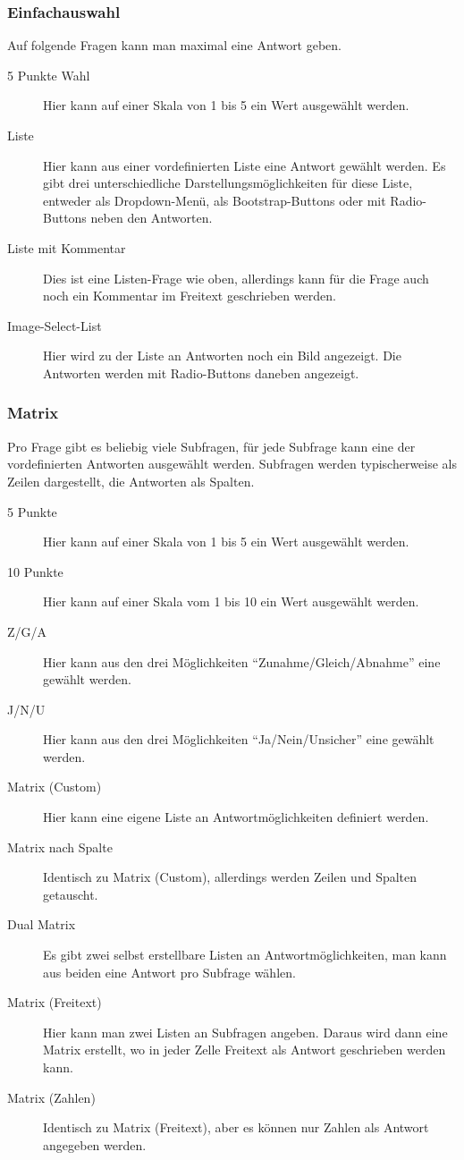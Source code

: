 \subsubsection{Einfachauswahl}

Auf folgende Fragen kann man maximal eine Antwort geben.
\begin{description}
	\item[5 Punkte Wahl] Hier kann auf einer Skala von 1 bis 5 ein Wert ausgewählt werden.
	\item[Liste] Hier kann aus einer vordefinierten Liste eine Antwort gewählt werden. Es gibt drei unterschiedliche Darstellungsmöglichkeiten für diese Liste, entweder als Dropdown-Menü, als Bootstrap-Buttons oder mit Radio-Buttons neben den Antworten.
	\item[Liste mit Kommentar] Dies ist eine Listen-Frage wie oben, allerdings kann für die Frage auch noch ein Kommentar im Freitext geschrieben werden.
	\item[Image-Select-List] Hier wird zu der Liste an Antworten noch ein Bild angezeigt. Die Antworten werden mit Radio-Buttons daneben angezeigt.
\end{description}

\subsubsection{Matrix}

Pro Frage gibt es beliebig viele Subfragen, für jede Subfrage kann eine der vordefinierten Antworten ausgewählt werden.
Subfragen werden typischerweise als Zeilen dargestellt, die Antworten als Spalten.

\begin{description}
	\item[5 Punkte] Hier kann auf einer Skala von 1 bis 5 ein Wert ausgewählt werden.
	\item[10 Punkte] Hier kann auf einer Skala vom 1 bis 10 ein Wert ausgewählt werden.
	\item[Z/G/A] Hier kann aus den drei Möglichkeiten \enquote{Zunahme/Gleich/Abnahme} eine gewählt werden.
	\item[J/N/U] Hier kann aus den drei Möglichkeiten \enquote{Ja/Nein/Unsicher} eine gewählt werden.
	\item[Matrix (Custom)] Hier kann eine eigene Liste an Antwortmöglichkeiten definiert werden.
	\item[Matrix nach Spalte] Identisch zu Matrix (Custom), allerdings werden Zeilen und Spalten getauscht.
	\item[Dual Matrix] Es gibt zwei selbst erstellbare Listen an Antwortmöglichkeiten, man kann aus beiden eine Antwort pro Subfrage wählen.
	\item[Matrix (Freitext)] Hier kann man zwei Listen an Subfragen angeben. Daraus wird dann eine Matrix erstellt, wo in jeder Zelle Freitext als Antwort geschrieben werden kann.
	\item[Matrix (Zahlen)] Identisch zu Matrix (Freitext), aber es können nur Zahlen als Antwort angegeben werden.
\end{description}

